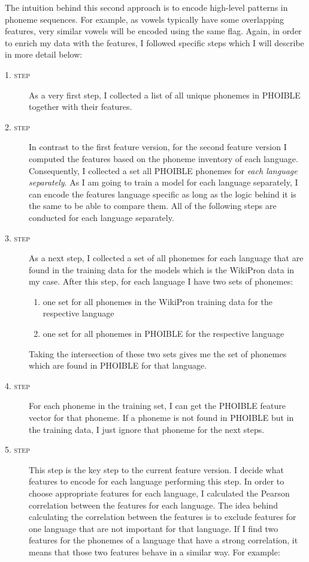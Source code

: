The intuition behind this second approach is to encode high-level patterns in phoneme sequences. For example, as vowels typically have some overlapping features, very similar vowels will be encoded using the same flag. Again, in order to enrich my data with the features, I followed specific steps which I will describe in more detail below: 

\begin{description}
    \item[\textsc{1. step}] As a very first step, I collected a list of all unique phonemes in PHOIBLE together with their features.
    \item[\textsc{2. step}] In contrast to the first feature version, for the second feature version I computed the features based on the phoneme inventory of each language. Consequently, I collected a set all PHOIBLE phonemes for \textit{each language separately}. As I am going to train a model for each language separately, I can encode the features language specific as long as the logic behind it is the same to be able to compare them. All of the following steps are conducted for each language separately.
    \item[\textsc{3. step}] As a next step, I collected a set of all phonemes for each language that are found in the training data for the models which is the WikiPron data in my case. 
    After this step, for each language I have two sets of phonemes:
    \begin{enumerate}
        \item one set for all phonemes in the WikiPron training data for the respective language
        \item one set for all phonemes in PHOIBLE for the respective language
    \end{enumerate}
    Taking the intersection of these two sets gives me the set of phonemes which are found in PHOIBLE for that language.
    \item[\textsc{4. step}] For each phoneme in the training set, I can get the PHOIBLE feature vector for that phoneme. If a phoneme is not found in PHOIBLE but in the training data, I just ignore that phoneme for the next steps.
    \item[\textsc{5. step}] This step is the key step to the current feature version. I decide what features to encode for each language performing this step. In order to choose appropriate features for each language, I calculated the Pearson correlation between the features for each language. The idea behind calculating the correlation between the features is to exclude features for one language that are not important for that language. If I find two features for the phonemes of a language that have a strong correlation, it means that those two features behave in a similar way. For example:
    

\end{description}
